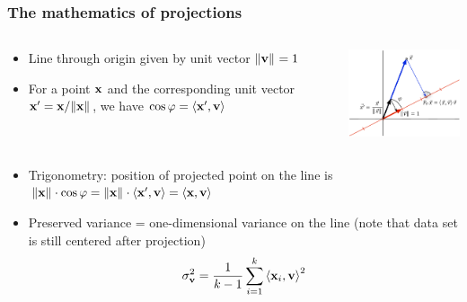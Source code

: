 \documentclass[t]{beamer} %
\begin{document}
\begin{frame}
  \frametitle{The mathematics of projections}

  \begin{columns}[c]
    \begin{column}{50mm}
      \begin{itemize}
      \item Line through origin given by unit vector
        $\norm{\vv} = 1$
      \item For a point $\vx$ and the corresponding unit vector $\vx' = \vx /
        \norm{\vx}$, we have \( \cos \varphi = \sprod{\vx'}{\vv} \)
      \end{itemize}
    \end{column}
    \begin{column}{50mm}
      \includegraphics[width=50mm]{img/3_cosine_projection}
    \end{column}
  \end{columns}
  
  \pause
  \begin{itemize}
  \item Trigonometry: position of projected point on the line is
    $\norm{\vx}\cdot \cos\varphi = \norm{\vx}\cdot \sprod{\vx'}{\vv} =
    \sprod{\vx}{\vv}$
  \item Preserved variance = one-dimensional variance on the line
    (note that data set is still centered after projection)
    \[
    \sigma_{\vv}^2 = \frac{1}{k-1} \sum_{i=1}^k \sprod{\vx_i}{\vv}^2
    \]
  \end{itemize}
\end{frame}
\end{document}
